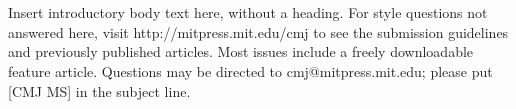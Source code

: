 
\section{}
Insert introductory body text here, without a heading.
For style questions not answered here, visit http://mitpress.mit.edu/cmj to see the submission guidelines and previously published articles.  Most issues include a freely downloadable feature article.  Questions may be directed to cmj@mitpress.mit.edu; please put [CMJ MS] in the subject line.
